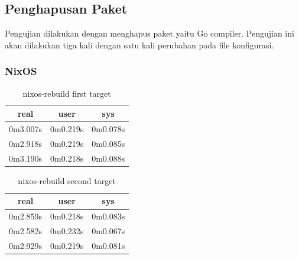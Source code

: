 \documentclass[10pt,]{report}
\begin{document}
\begin{adjustwidth}{20pt}{}
	\subsection{Penghapusan Paket}
	\begin{adjustwidth}{20pt}{}
		Pengujian dilakukan dengan menghapus paket yaitu Go compiler.
		Pengujian ini akan dilakukan tiga kali dengan satu kali perubahan pada file
		konfigurasi.
	\end{adjustwidth}
	\subsubsection{NixOS}
	\begin{table}[H]
		\caption{nixos-rebuild first target}
		\begin{center}
			\begin{tabular}[c]{|c|c|c|}
				\hline
				\multicolumn{1}{|c|}{\textbf{real}} &
				\multicolumn{1}{c|}{\textbf{user}}  &
				\multicolumn{1}{c|}{\textbf{sys}}                         \\
				\hline
				0m3.007s                            & 0m0.219s & 0m0.078s \\
				\hline
				0m2.918s                            & 0m0.219s & 0m0.085s \\
				\hline
				0m3.190s                            & 0m0.218s & 0m0.088s \\
				\hline
			\end{tabular}
		\end{center}
	\end{table}
	\begin{table}[H]
		\caption{nixos-rebuild second target}
		\begin{center}
			\begin{tabular}[c]{|c|c|c|}
				\hline
				\multicolumn{1}{|c|}{\textbf{real}} &
				\multicolumn{1}{c|}{\textbf{user}}  &
				\multicolumn{1}{c|}{\textbf{sys}}                         \\
				\hline
				0m2.859s                            & 0m0.218s & 0m0.083s \\
				\hline
				0m2.582s                            & 0m0.232s & 0m0.067s \\
				\hline
				0m2.929s                            & 0m0.219s & 0m0.081s \\
				\hline
			\end{tabular}
		\end{center}
	\end{table}

\end{adjustwidth}
\end{document}
